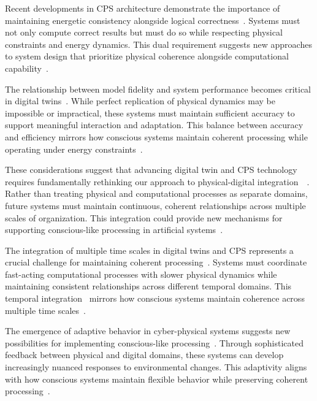 Recent developments in CPS architecture demonstrate the importance of maintaining energetic consistency alongside logical correctness~\cite{Grieves2021,Liu2021}. Systems must not only compute correct results but must do so while respecting physical constraints and energy dynamics. This dual requirement suggests new approaches to system design that prioritize physical coherence alongside computational capability~\cite{Tao2019,Perunov2020}.

The relationship between model fidelity and system performance becomes critical in digital twins~\cite{Tao2019,Rasheed2020}. While perfect replication of physical dynamics may be impossible or impractical, these systems must maintain sufficient accuracy to support meaningful interaction and adaptation. This balance between accuracy and efficiency mirrors how conscious systems maintain coherent processing while operating under energy constraints~\cite{Uhlemann2017,Kolchinsky2020}.

These considerations suggest that advancing digital twin and CPS technology requires fundamentally rethinking our approach to physical-digital integration~~\cite{Wang2019,Boschert2019}. Rather than treating physical and computational processes as separate domains, future systems must maintain continuous, coherent relationships across multiple scales of organization. This integration could provide new mechanisms for supporting conscious-like processing in artificial systems~\cite{White2021,seth2024conscious}.

The integration of multiple time scales in digital twins and CPS represents a crucial challenge for maintaining coherent processing~\cite{Fuller2020,hasson2015hierarchical}. Systems must coordinate fast-acting computational processes with slower physical dynamics while maintaining consistent relationships across different temporal domains. This temporal integration~ mirrors how conscious systems maintain coherence across multiple time scales~\cite{Jones2020,amil2024theta}.

The emergence of adaptive behavior in cyber-physical systems suggests new possibilities for implementing conscious-like processing~\cite{Madni2019,Boahen2021}. Through sophisticated feedback between physical and digital domains, these systems can develop increasingly nuanced responses to environmental changes. This adaptivity aligns with how conscious systems maintain flexible behavior while preserving coherent processing~\cite{Minerva2020,Friston2010}.

